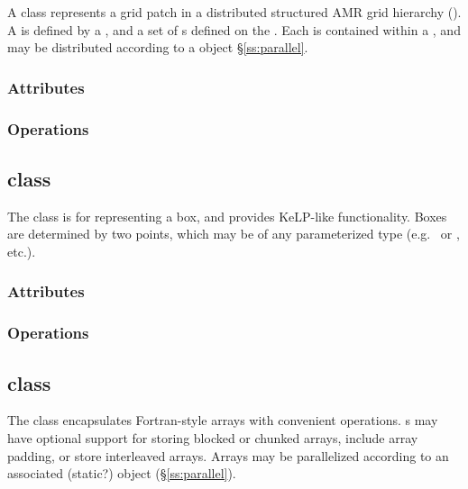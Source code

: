\documentclass{article}
\begin{document}
A  class represents a grid patch in a distributed structured
AMR grid hierarchy ().  A  is defined by a
, and a set of s defined on the .  Each
 is contained within a , and may be distributed
according to a  object \S\ref{ss:parallel}.

\subsubsection{Attributes}

\subsubsection{Operations}

\subsection{ class}

The  class is for representing a box, and provides KeLP-like functionality.
Boxes are determined by two points, which may be of any parameterized type
(e.g.~ or , etc.).


\subsubsection{Attributes}

\subsubsection{Operations}

\subsection{ class}

The  class encapsulates Fortran-style arrays with
convenient operations.  s may have optional support for
storing blocked or chunked arrays, include array padding, or store
interleaved arrays.  Arrays may be parallelized according to an
associated (static?)  object (\S\ref{ss:parallel}).
\end{document}
